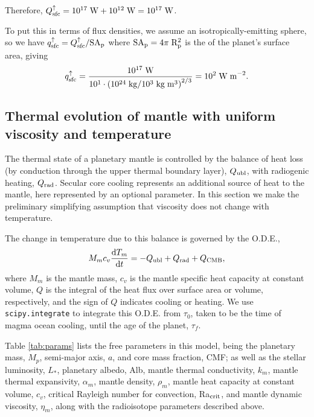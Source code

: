 \documentclass[10pt,a4paper]{article}
\begin{document}
Therefore, $Q_{\rm sfc}^{\uparrow} = 10^{17} \; {\rm W} + 10^{12} \; {\rm W} = 10^{17} \; {\rm W}$.

To put this in terms of flux densities, we assume an isotropically-emitting sphere, so we have $q_{\rm sfc}^{\uparrow} = Q_{\rm sfc}^{\uparrow}/\rm{SA}_p$ where $\rm{SA}_p = 4\pi\;R_p^2$ is the of the planet's surface area, giving 
\begin{equation}
q_{\rm sfc}^{\uparrow} = \frac{10^{17} \; {\rm W}}{10^1 \cdot \left(10^{24}\;{\rm kg}/10^3 \; {\rm kg}\;{\rm m}^3\right)^{2/3}} = 10^2 \; \rm{W\;m}^{-2}.
\end{equation}

\subsection{Thermal evolution of mantle with uniform viscosity and temperature}

The thermal state of a planetary mantle is controlled by the balance of heat loss (by conduction through the upper thermal boundary layer), $Q_{\rm ubl}$, with radiogenic heating, $Q_{\rm rad}$. Secular core cooling represents an additional source of heat to the mantle, here represented by an optional parameter. In this section we make the preliminary simplifying assumption that viscosity does not change with temperature.

The change in temperature due to this balance is governed by the O.D.E.,
\begin{equation}
M_m c_v \frac{{\rm d}T_m}{{\rm d}t} = -Q_{\rm ubl} + Q_{\rm rad} + Q_{\rm CMB},
\end{equation}
where $M_m$ is the mantle mass, $c_v$ is the mantle specific heat capacity at constant volume, $Q$ is the integral of the heat flux over surface area or volume, respectively, and the sign of $Q$ indicates cooling or heating. We use {\tt scipy.integrate} to integrate this O.D.E. from $\tau_0$, taken to be the time of magma ocean cooling, until the age of the planet, $\tau_f$.  

\begin{table}
\label{tab:params}
\end{table}

Table \ref{tab:params} lists the free parameters in this model, being the planetary mass, $M_p$, semi-major axis, $a$, and core mass fraction, CMF; as well as the stellar luminosity, $L_*$, planetary albedo, Alb, mantle thermal conductivity, $k_m$, mantle thermal expansivity, $\alpha_m$, mantle density, $\rho_m$, mantle heat capacity at constant volume, $c_v$, critical Rayleigh number for convection, Ra$_{\rm crit}$, and mantle dynamic viscosity, $\eta_m$, along with the radioisotope parameters described above.
\end{document}
